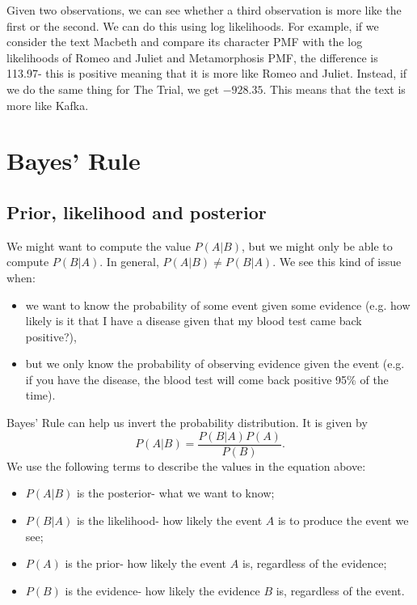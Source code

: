\documentclass[a4paper, openany]{memoir}
\begin{document}

Given two observations, we can see whether a third observation is more like the first or the second. We can do this using log likelihoods. For example, if we consider the text Macbeth and compare its character PMF with the log likelihoods of Romeo and Juliet and Metamorphosis PMF, the difference is 113.97- this is positive meaning that it is more like Romeo and Juliet. Instead, if we do the same thing for The Trial, we get $-928.35$. This means that the text is more like Kafka.
\newpage

\section{Bayes' Rule}
\subsection{Prior, likelihood and posterior}
We might want to compute the value $P(A|B)$, but we might only be able to compute $P(B|A)$. In general, $P(A|B) \neq P(B|A)$. We see this kind of issue when:
\begin{itemize}
    \item we want to know the probability of some event given some evidence (e.g. how likely is it that I have a disease given that my blood test came back positive?),
    \item but we only know the probability of observing evidence given the event (e.g. if you have the disease, the blood test will come back positive 95\% of the time).
\end{itemize}
Bayes' Rule can help us invert the probability distribution. It is given by
\[P(A|B) = \frac{P(B|A)P(A)}{P(B)}.\]
We use the following terms to describe the values in the equation above:
\begin{itemize}
    \item $P(A|B)$ is the posterior- what we want to know;
    \item $P(B|A)$ is the likelihood- how likely the event $A$ is to produce the event we see;
    \item $P(A)$ is the prior- how likely the event $A$ is, regardless of the evidence;
    \item $P(B)$ is the evidence- how likely the evidence $B$ is, regardless of the event.
\end{itemize}
\end{document}
